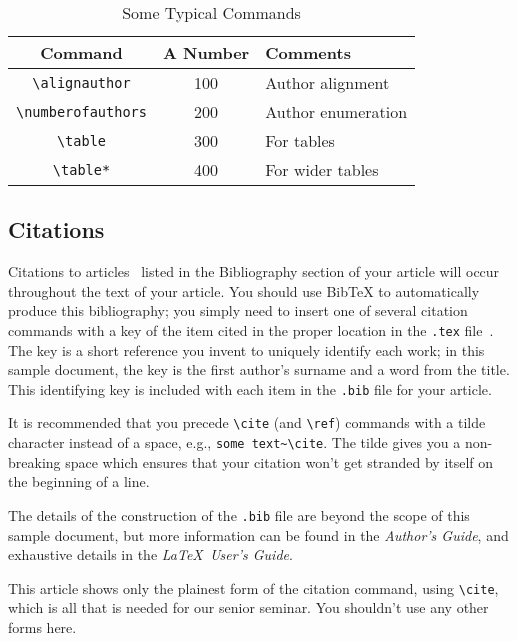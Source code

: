 \documentclass{sig-alternate}
\begin{document}
\begin{table*}[t]
\centering
\caption{Some Typical Commands}
\label{tab:typicalCommands}
\begin{tabular}{ccl}
Command & A Number & Comments \\ \hline
\texttt{\textbackslash alignauthor}     & 100 & Author alignment\\
\texttt{\textbackslash numberofauthors} & 200 & Author enumeration\\
\texttt{\textbackslash table}           & 300 & For tables\\
\texttt{\textbackslash table*}          & 400 & For wider tables\\ 
\end{tabular}
\end{table*}

\subsection{Citations}
\label{sec:citations}

Citations to articles~\cite{Aaronson:2005,Garey:1979,Brun:2008} listed
in the Bibliography section of your
article will occur throughout the text of your article.
You should use BibTeX to automatically produce this bibliography;
you simply need to insert one of several citation commands with
a key of the item cited in the proper location in
the \texttt{.tex} file~\cite{OM:2008}.
The key is a short reference you invent to uniquely
identify each work; in this sample document, the key is
the first author's surname and a
word from the title.  This identifying key is included
with each item in the \texttt{.bib} file for your article.

It is recommended that you precede \texttt{\textbackslash cite} (and 
\texttt{\textbackslash ref}) commands with a tilde
character instead of a space, e.g., \texttt{some text\textasciitilde\textbackslash cite}. The tilde gives you a non-breaking space which ensures that your citation won't get
stranded by itself on the beginning of a line.

The details of the construction of the \texttt{.bib} file
are beyond the scope of this sample document, but more
information can be found in the \textit{Author's Guide},
and exhaustive details in the \textit{\LaTeX\ User's
Guide}.

This article shows only the plainest form
of the citation command, using \texttt{\textbackslash cite},
which is all that is needed for our senior seminar.
You shouldn't use any other forms here.
\end{document}
